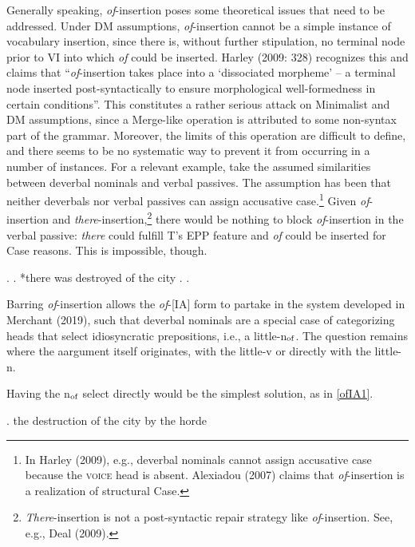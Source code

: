 \documentclass[12pt]{article}
\newcommand*{\textsub}[1]{\ensuremath{_\textrm{{\scriptsize #1}}}}
\begin{document}
Generally speaking, \textit{of}-insertion poses some theoretical issues that need to be addressed. Under DM assumptions, \textit{of}-insertion cannot be a simple instance of vocabulary insertion, since there is, without further stipulation, no terminal node prior to VI into which \textit{of} could be inserted. Harley (2009: 328) recognizes this and claims that ``\textit{of}-insertion takes place into a `dissociated morpheme' -- a terminal node inserted post-syntactically to ensure morphological well-formedness in certain conditions''. This constitutes a rather serious attack on Minimalist and DM assumptions, since a Merge-like operation is attributed to some non-syntax part of the grammar. Moreover, the limits of this operation are difficult to define, and there seems to be no systematic way to prevent it from occurring in a number of instances. For a relevant example, take the assumed similarities between deverbal nominals and verbal passives. The assumption has been that neither deverbals nor verbal passives can assign accusative case.\footnote{ In Harley (2009), e.g., deverbal nominals cannot assign accusative case because the \textsc{voice} head is absent. Alexiadou (2007) claims that \textit{of}-insertion is a realization of structural Case.} Given \textit{of}-insertion and \textit{there}-insertion,\footnote{ \textit{There}-insertion is not a post-syntactic repair strategy like \textit{of}-insertion. See, e.g., Deal (2009).} there would be nothing to block \textit{of}-insertion in the verbal passive: \textit{there} could fulfill T's EPP feature and \textit{of} could be inserted for Case reasons. This is impossible, though.

\singlespacing

\ex. 
\a. *there was destroyed of the city
\z. \z. \par

\doublespacing

Barring \textit{of}-insertion allows the \textit{of}-[IA] form to partake in the system developed in Merchant (2019), such that deverbal nominals are a special case of categorizing heads that select idiosyncratic prepositions, i.e., a little-n\textsub{of}. The question remains where the aargument itself originates, with the little-v or directly with the little-n.

Having the n\textsub{of} select directly would be the simplest solution, as in \ref{ofIA1}.

\singlespacing 

\ex. \label{ofIA1} the destruction of the city by the horde
\end{document}
